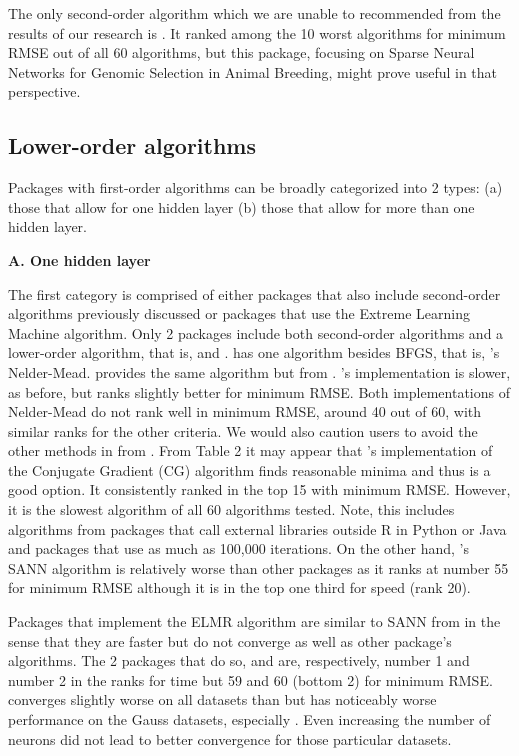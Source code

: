 The only second-order algorithm which we are unable to recommended from
the results of our research is  \citep{R-snnR}. It ranked
among the 10 worst algorithms for minimum RMSE out of all 60 algorithms,
but this package, focusing on Sparse Neural Networks for Genomic
Selection in Animal Breeding, might prove useful in that perspective.

\hypertarget{lower-order-algorithms}{%
\subsection{Lower-order algorithms}\label{lower-order-algorithms}}

Packages with first-order algorithms can be broadly categorized into 2
types: (a) those that allow for one hidden layer (b) those that allow
for more than one hidden layer.

\textbf{A. One hidden layer}

The first category is comprised of either packages that also include
second-order algorithms previously discussed or packages that use the
Extreme Learning Machine algorithm. Only 2 packages include both
second-order algorithms and a lower-order algorithm, that is,
 and .  has one
algorithm besides BFGS, that is, 's Nelder-Mead.
 provides the same algorithm but from .
's implementation is slower, as before, but ranks
slightly better for minimum RMSE. Both implementations of Nelder-Mead do
not rank well in minimum RMSE, around 40 out of 60, with similar ranks
for the other criteria. We would also caution users to avoid the other
methods in  from . From Table 2 it may
appear that 's implementation of the Conjugate
Gradient (CG) algorithm finds reasonable minima and thus is a good
option. It consistently ranked in the top 15 with minimum RMSE. However,
it is the slowest algorithm of all 60 algorithms tested. Note, this
includes algorithms from packages that call external libraries outside
\textsf{R} in \textsf{Python} or \textsf{Java} and packages that use as
much as 100,000 iterations. On the other hand, 's SANN
algorithm is relatively worse than other packages as it ranks at number
55 for minimum RMSE although it is in the top one third for speed (rank
20).

Packages that implement the ELMR algorithm are similar to SANN from
 in the sense that they are faster but do not converge
as well as other package's algorithms. The 2 packages that do so,
 \citep{R-elmNNRcpp} and 
\citep{R-ELMR} are, respectively, number 1 and number 2 in the ranks for
time but 59 and 60 (bottom 2) for minimum RMSE.  converges
slightly worse on all datasets than  but has
noticeably worse performance on the Gauss datasets, especially
. Even increasing the number of neurons did not lead to
better convergence for those particular datasets.


